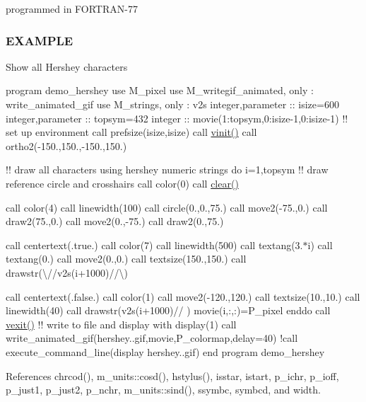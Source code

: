 programmed in F\+O\+R\+T\+R\+A\+N-\/77 \subsubsection*{E\+X\+A\+M\+P\+LE}

Show all Hershey characters

program demo\+\_\+hershey use M\+\_\+pixel use M\+\_\+writegif\+\_\+animated, only \+: write\+\_\+animated\+\_\+gif use M\+\_\+strings, only \+: v2s integer,parameter \+:\+: isize=600 integer,parameter \+:\+: topsym=432 integer \+:\+: movie(1\+:topsym,0\+:isize-\/1,0\+:isize-\/1) !! set up environment call prefsize(isize,isize) call \hyperlink{namespacem__pixel_ac03ca8f23fdadb60599b6ea4dc87a6d9}{vinit()} call ortho2(-\/150.,150.,-\/150.,150.)

!! draw all characters using hershey numeric strings do i=1,topsym !! draw reference circle and crosshairs call color(0) call \hyperlink{namespacem__pixel_af3b81a21a0b2f6b5eddd09c031bd6173}{clear()}

call color(4) call linewidth(100) call circle(0.,0.,75.) call move2(-\/75.,0.) call draw2(75.,0.) call move2(0.,-\/75.) call draw2(0.,75.)

call centertext(.true.) call color(7) call linewidth(500) call textang(3.$\ast$i) call textang(0.) call move2(0.,0.) call textsize(150.,150.) call drawstr(\textquotesingle{}\textbackslash{}\textquotesingle{}//v2s(i+1000)//\textquotesingle{}\textbackslash{}\textquotesingle{})

call centertext(.false.) call color(1) call move2(-\/120.,120.) call textsize(10.,10.) call linewidth(40) call drawstr(v2s(i+1000)//\textquotesingle{} \textquotesingle{}) movie(i,\+:,\+:)=P\+\_\+pixel enddo call \hyperlink{namespacem__pixel_a19ad6b65752322b0029a62cc0ebec3e8}{vexit()} !! write to file and display with display(1) call write\+\_\+animated\+\_\+gif(\textquotesingle{}hershey..\+gif\textquotesingle{},movie,P\+\_\+colormap,delay=40) !call execute\+\_\+command\+\_\+line(\textquotesingle{}display hershey..\+gif\textquotesingle{}) end program demo\+\_\+hershey 

References chrcod(), m\+\_\+units\+::cosd(), hstylus(), isstar, istart, p\+\_\+ichr, p\+\_\+ioff, p\+\_\+just1, p\+\_\+just2, p\+\_\+nchr, m\+\_\+units\+::sind(), ssymbc, symbcd, and width.

